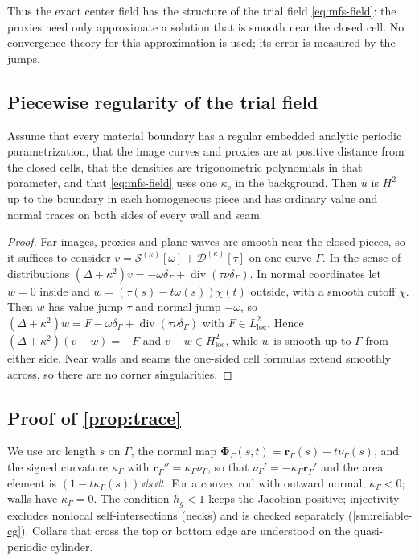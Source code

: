 Thus the exact center field has the structure of the trial field
\eqref{eq:mfs-field}: the proxies need only approximate a solution that is smooth
near the closed cell. No convergence theory for this approximation is used; its
error is measured by the jumps.

\subsection{Piecewise regularity of the trial field}\label{sm:proof-piecewise-h2}
\begin{proposition}\label{sm:prop-piecewise-h2}
Assume that every material boundary has a regular embedded analytic periodic
parametrization, that the image curves and proxies are at positive distance from the
closed cells, that the densities are trigonometric polynomials in that parameter, and
that
\eqref{eq:mfs-field} uses one $\kappa_{\mathrm e}$ in the background. Then
$\widehat u$ is $H^2$ up to the boundary in each homogeneous piece and has ordinary
value and normal traces on both sides of every wall and seam.
\end{proposition}

\begin{proof}
Far images, proxies and plane waves are smooth near the closed pieces, so it
suffices to consider $v=\mathcal S^{(\kappa)}[\omega]+\mathcal D^{(\kappa)}[\tau]$ on
one curve $\Gamma$. In the sense of distributions $(\Delta+\kappa^2)v=
-\omega\delta_\Gamma+\operatorname{div}(\tau\nu\delta_\Gamma)$. In normal coordinates
let $w=0$ inside and $w=(\tau(s)-t\omega(s))\chi(t)$ outside, with a smooth cutoff
$\chi$. Then $w$ has value jump $\tau$ and normal jump $-\omega$, so
$(\Delta+\kappa^2)w=F-\omega\delta_\Gamma+\operatorname{div}(\tau\nu\delta_\Gamma)$ with
$F\in L^2_{\mathrm{loc}}$. Hence $(\Delta+\kappa^2)(v-w)=-F$ and $v-w\in
H^2_{\mathrm{loc}}$, while $w$ is smooth up to $\Gamma$ from either side. Near walls
and seams the one-sided cell formulas extend smoothly across, so there are no
corner singularities.
\end{proof}

\subsection{Proof of \texorpdfstring{\cref{prop:trace}}{Proposition 5.1}}\label{sm:proof-trace}
We use arc length $s$ on $\Gamma$, the normal map
$\boldsymbol\Phi_\Gamma(s,t)=\boldsymbol r_\Gamma(s)+t\nu_\Gamma(s)$, and the signed
curvature $\kappa_\Gamma$ with $\boldsymbol r_\Gamma''=\kappa_\Gamma\nu_\Gamma$, so that
$\nu_\Gamma'=-\kappa_\Gamma\boldsymbol r_\Gamma'$ and the area element is
$(1-t\kappa_\Gamma(s))\,\dd s\,\dd t$. For a convex rod with outward normal,
$\kappa_\Gamma<0$; walls have $\kappa_\Gamma=0$. The condition $h_g<1$ keeps the
Jacobian positive; injectivity excludes nonlocal self-intersections (necks) and is
checked separately (\cref{sm:reliable-cg}). Collars that cross the top or bottom
edge are understood on the quasi-periodic cylinder.

